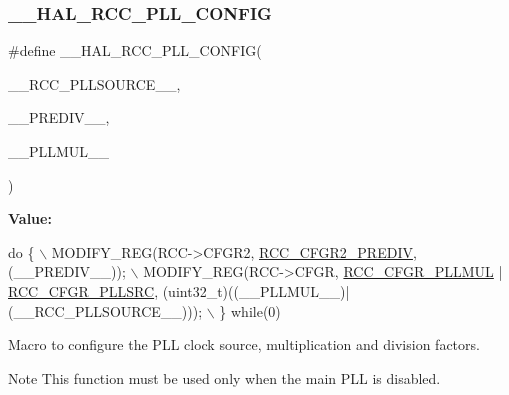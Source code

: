 \subsubsection{\texorpdfstring{\+\_\+\+\_\+\+H\+A\+L\+\_\+\+R\+C\+C\+\_\+\+P\+L\+L\+\_\+\+C\+O\+N\+F\+IG}{\_\_HAL\_RCC\_PLL\_CONFIG}}
{\footnotesize\ttfamily \#define \+\_\+\+\_\+\+H\+A\+L\+\_\+\+R\+C\+C\+\_\+\+P\+L\+L\+\_\+\+C\+O\+N\+F\+IG(\begin{DoxyParamCaption}\item[{}]{\+\_\+\+\_\+\+R\+C\+C\+\_\+\+P\+L\+L\+S\+O\+U\+R\+C\+E\+\_\+\+\_\+,  }\item[{}]{\+\_\+\+\_\+\+P\+R\+E\+D\+I\+V\+\_\+\+\_\+,  }\item[{}]{\+\_\+\+\_\+\+P\+L\+L\+M\+U\+L\+\_\+\+\_\+ }\end{DoxyParamCaption})}

{\bfseries Value\+:}
\begin{DoxyCode}
\textcolor{keywordflow}{do} \{ \(\backslash\)
                    MODIFY\_REG(RCC->CFGR2, \hyperlink{group___peripheral___registers___bits___definition_ga022892b6d0e4ee671b82e7f6552b0074}{RCC\_CFGR2\_PREDIV}, (\_\_PREDIV\_\_)); \(\backslash\)
                    MODIFY\_REG(RCC->CFGR, \hyperlink{group___peripheral___registers___bits___definition_ga538fd5df8d890696483a0e901d739309}{RCC\_CFGR\_PLLMUL} | 
      \hyperlink{group___peripheral___registers___bits___definition_gaba4a5dbbd286f07a97f5aa6e6f3f6a57}{RCC\_CFGR\_PLLSRC}, (uint32\_t)((\_\_PLLMUL\_\_)|(\_\_RCC\_PLLSOURCE\_\_))); \(\backslash\)
                  \} \textcolor{keywordflow}{while}(0)
\end{DoxyCode}


Macro to configure the P\+LL clock source, multiplication and division factors. 

\begin{DoxyNote}{Note}
This function must be used only when the main P\+LL is disabled.
\end{DoxyNote}

